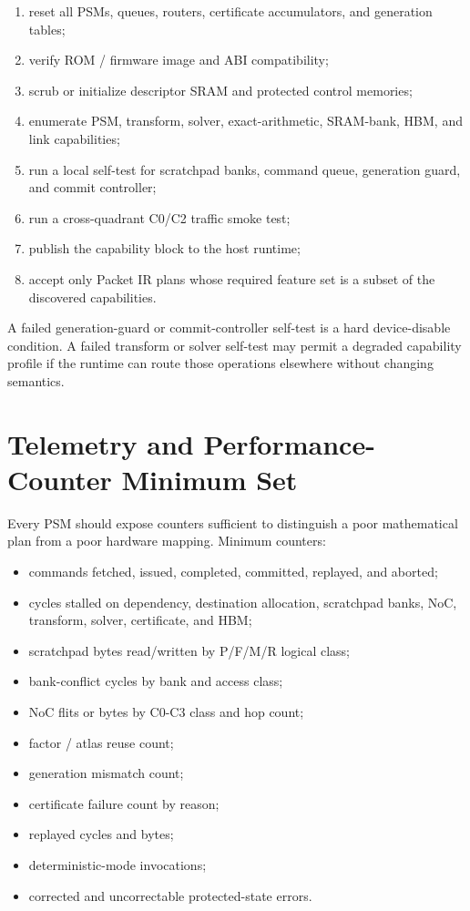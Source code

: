 \documentclass[10pt,letterpaper]{article}
\begin{document}
{{{\begin{enumerate}
\item reset all PSMs, queues, routers, certificate accumulators, and generation tables;
\item verify ROM / firmware image and ABI compatibility;
\item scrub or initialize descriptor SRAM and protected control memories;
\item enumerate PSM, transform, solver, exact-arithmetic, SRAM-bank, HBM, and link capabilities;
\item run a local self-test for scratchpad banks, command queue, generation guard, and commit controller;
\item run a cross-quadrant C0/C2 traffic smoke test;
\item publish the capability block to the host runtime;
\item accept only Packet IR plans whose required feature set is a subset of the discovered capabilities.
\end{enumerate}

A failed generation-guard or commit-controller self-test is a hard device-disable condition. A failed transform or solver self-test may permit a degraded capability profile if the runtime can route those operations elsewhere without changing semantics.

\section{Telemetry and Performance-Counter Minimum Set}

Every PSM should expose counters sufficient to distinguish a poor mathematical plan from a poor hardware mapping. Minimum counters:

\begin{itemize}
\item commands fetched, issued, completed, committed, replayed, and aborted;
\item cycles stalled on dependency, destination allocation, scratchpad banks, NoC, transform, solver, certificate, and HBM;
\item scratchpad bytes read/written by P/F/M/R logical class;
\item bank-conflict cycles by bank and access class;
\item NoC flits or bytes by C0-C3 class and hop count;
\item factor / atlas reuse count;
\item generation mismatch count;
\item certificate failure count by reason;
\item replayed cycles and bytes;
\item deterministic-mode invocations;
\item corrected and uncorrectable protected-state errors.
\end{itemize}

}}}
\end{document}

